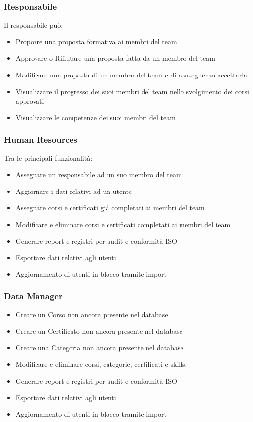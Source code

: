 \subsubsection{Responsabile}
Il responsabile può:
\begin{itemize}
    \item Proporre una proposta formativa ai membri del team
    \item Approvare o Rifiutare una proposta fatta da un membro del team
    \item Modificare una proposta di un membro del team e di conseguenza accettarla
    \item Visualizzare il progresso dei suoi membri del team nello svolgimento dei corsi approvati
    \item Visualizzare le competenze dei suoi membri del team
\end{itemize}

\subsubsection{Human Resources}
Tra le principali funzionalità:
\begin{itemize}
    \item Assegnare un responsabile ad un suo membro del team
    \item Aggiornare i dati relativi ad un utente
    \item Assegnare corsi e certificati già completati ai membri del team
    \item Modificare e eliminare corsi e certificati completati ai membri del team
    \item Generare report e registri per audit e conformità ISO
    \item Esportare dati relativi agli utenti
    \item Aggiornamento di utenti in blocco tramite import
\end{itemize}

\subsubsection{Data Manager}
\begin{itemize}
    \item Creare un Corso non ancora presente nel database
    \item Creare un Certificato non ancora presente nel database
    \item Creare una Categoria non ancora presente nel database
    \item Modificare e eliminare corsi, categorie, certificati e skills.
    \item Generare report e registri per audit e conformità ISO
    \item Esportare dati relativi agli utenti
    \item Aggiornamento di utenti in blocco tramite import
\end{itemize}

